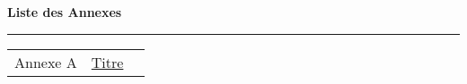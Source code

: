 
\Annexes
{}
\renewcommand{\thechapter}{A}
\setcounter{figure}{0}
\renewcommand{\leftmark}{Annexes}
\renewcommand{\rightmark}{Annexes}
  \vspace{15pt}%
  {\Huge {}\selectfont \textbf{Liste des Annexes}}
   \par\nobreak
    \vspace{15pt}
       \hrule
   \vskip20pt
	\normalsize

\begin{tabular}{lp{11.5cm}r}
	Annexe A & \hyperref[annexe-artcile]{Titre}  \dotfill& \textbf{\pageref{annexe-article}}\\
\end{tabular}

  \EmptyNewPage


{
}

